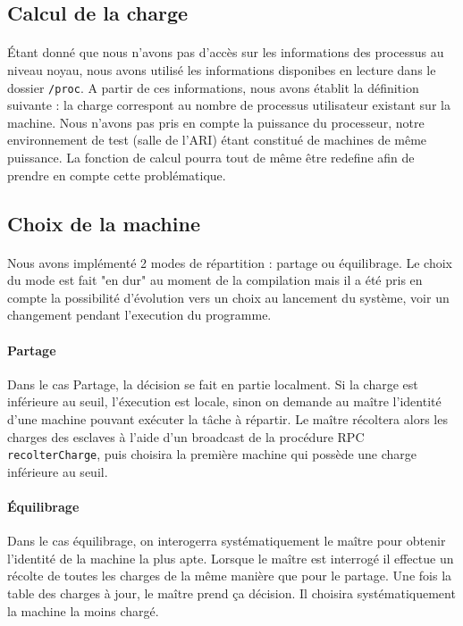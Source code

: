   \subsection{Calcul de la charge}
    \paragraph{}
    Étant donné que nous n'avons pas d'accès sur les informations des 
    processus au niveau noyau, nous avons utilisé les informations 
    disponibes en lecture dans le dossier \verb"/proc". A partir de ces 
    informations, nous avons établit la définition suivante :
    la charge correspont au nombre de processus utilisateur existant sur 
    la machine. Nous n'avons pas pris en compte la puissance du 
    processeur, notre environnement de test (salle de l'ARI) étant 
    constitué de machines de même puissance. La fonction de calcul pourra 
    tout de même être redefine afin de prendre en compte cette 
    problématique.
  
  \subsection{Choix de la machine}
    \paragraph{} 
    Nous avons implémenté 2 modes de  répartition : partage ou 
    équilibrage. Le choix du mode est fait "en dur" au moment de la 
    compilation mais il a été pris en compte la possibilité d'évolution 
    vers un choix au lancement du système, voir un changement pendant 
    l'execution du programme.
    
    \paragraph{Partage} 
    Dans le cas Partage, la décision se fait en partie localment. Si la 
    charge est inférieure au seuil, l'éxecution est locale, sinon on 
    demande au maître l'identité d'une machine pouvant exécuter la tâche
    à répartir. Le maître récoltera alors les charges des esclaves à 
    l'aide d'un broadcast de la procédure RPC \verb"recolterCharge", 
    puis choisira la première machine qui possède une charge inférieure 
    au seuil.
    
    \paragraph{Équilibrage}
    Dans le cas équilibrage, on interogerra systématiquement le maître 
    pour obtenir l'identité de la machine la plus apte.
    Lorsque le maître est interrogé il effectue un récolte de toutes les 
    charges de la même manière que pour le partage. Une fois la table 
    des charges à jour, le maître prend ça décision. Il choisira 
    systématiquement la machine la moins chargé.
    
